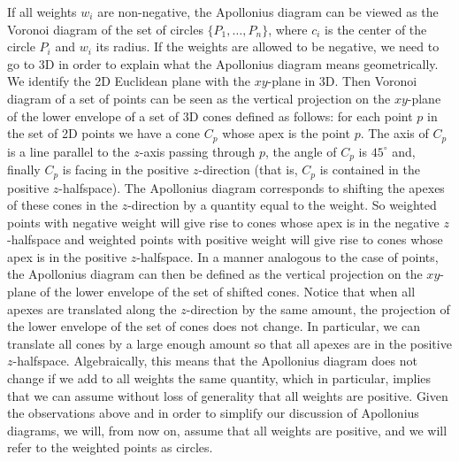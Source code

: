 If all weights $w_i$ are non-negative, the Apollonius
diagram can be viewed as the Voronoi diagram of the set of circles
$\{P_1,\ldots, P_n\}$, where $c_i$ is the center of the circle $P_i$
and $w_i$ its radius. If the weights are allowed to be negative,
we need to go to 3D in order to explain what the Apollonius diagram
means geometrically. We identify the 2D Euclidean plane with the
$xy$-plane in 3D. Then Voronoi diagram of a set of points can be
seen as the vertical projection on the $xy$-plane of the lower
envelope of a set of 3D cones defined as follows: for each point $p$
in the set of 2D points we have a cone $C_p$ whose apex is the point
$p$. The axis of 
$C_p$ is a line parallel to the $z$-axis passing through $p$, the
angle of $C_p$ is $45^\circ$ and, finally $C_p$ is facing in the
positive $z$-direction (that is, $C_p$ is contained in the positive
$z$-halfspace).
The Apollonius diagram corresponds to shifting the
apexes of these cones in the $z$-direction by a quantity equal to the
weight. So weighted points with negative weight will give rise to
cones whose apex is in the negative $z$-halfspace and weighted points
with positive weight will give rise to cones whose apex is in the
positive $z$-halfspace. In a manner analogous to the case of points,
the Apollonius diagram can then be defined as the vertical projection
on the $xy$-plane of the lower envelope of the set of shifted cones.
Notice that when all apexes are translated along the $z$-direction by
the same amount, the projection of the lower envelope of the set of
cones does not change. In particular, we can translate all cones by a
large enough amount so that all apexes are in the positive
$z$-halfspace. Algebraically, this means that the Apollonius diagram
does not change if we add to all weights the same quantity, which in
particular, implies that we can assume without loss of generality that
all weights are positive. Given the observations above and in order to
simplify our discussion of Apollonius diagrams, we will, from now on,
assume that all weights are positive, and we will refer to the
weighted points as circles.


